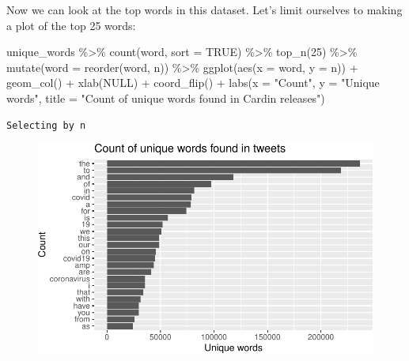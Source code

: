 \documentclass[
  letterpaper,
  DIV=11,
  numbers=noendperiod]{scrreprt}
\newenvironment{Shaded}{\begin{snugshade}}{\end{snugshade}}
\newcommand{\AttributeTok}[1]{\textcolor[rgb]{0.40,0.45,0.13}{#1}}
\newcommand{\ConstantTok}[1]{\textcolor[rgb]{0.56,0.35,0.01}{#1}}
\newcommand{\DecValTok}[1]{\textcolor[rgb]{0.68,0.00,0.00}{#1}}
\newcommand{\FunctionTok}[1]{\textcolor[rgb]{0.28,0.35,0.67}{#1}}
\newcommand{\NormalTok}[1]{\textcolor[rgb]{0.00,0.23,0.31}{#1}}
\newcommand{\SpecialCharTok}[1]{\textcolor[rgb]{0.37,0.37,0.37}{#1}}
\newcommand{\StringTok}[1]{\textcolor[rgb]{0.13,0.47,0.30}{#1}}
\begin{document}
Now we can look at the top words in this dataset. Let's limit ourselves
to making a plot of the top 25 words:

\begin{Shaded}
\begin{Highlighting}[]
\NormalTok{unique\_words }\SpecialCharTok{\%\textgreater{}\%}
  \FunctionTok{count}\NormalTok{(word, }\AttributeTok{sort =} \ConstantTok{TRUE}\NormalTok{) }\SpecialCharTok{\%\textgreater{}\%}
  \FunctionTok{top\_n}\NormalTok{(}\DecValTok{25}\NormalTok{) }\SpecialCharTok{\%\textgreater{}\%}
  \FunctionTok{mutate}\NormalTok{(}\AttributeTok{word =} \FunctionTok{reorder}\NormalTok{(word, n)) }\SpecialCharTok{\%\textgreater{}\%}
  \FunctionTok{ggplot}\NormalTok{(}\FunctionTok{aes}\NormalTok{(}\AttributeTok{x =}\NormalTok{ word, }\AttributeTok{y =}\NormalTok{ n)) }\SpecialCharTok{+}
  \FunctionTok{geom\_col}\NormalTok{() }\SpecialCharTok{+}
  \FunctionTok{xlab}\NormalTok{(}\ConstantTok{NULL}\NormalTok{) }\SpecialCharTok{+}
  \FunctionTok{coord\_flip}\NormalTok{() }\SpecialCharTok{+}
      \FunctionTok{labs}\NormalTok{(}\AttributeTok{x =} \StringTok{"Count"}\NormalTok{,}
      \AttributeTok{y =} \StringTok{"Unique words"}\NormalTok{,}
      \AttributeTok{title =} \StringTok{"Count of unique words found in Cardin releases"}\NormalTok{)}
\end{Highlighting}
\end{Shaded}

\begin{verbatim}
Selecting by n
\end{verbatim}

\begin{figure}[H]

{\centering \includegraphics{./textanalysis_files/figure-pdf/unnamed-chunk-7-1.pdf}

}

\end{figure}
\end{document}
